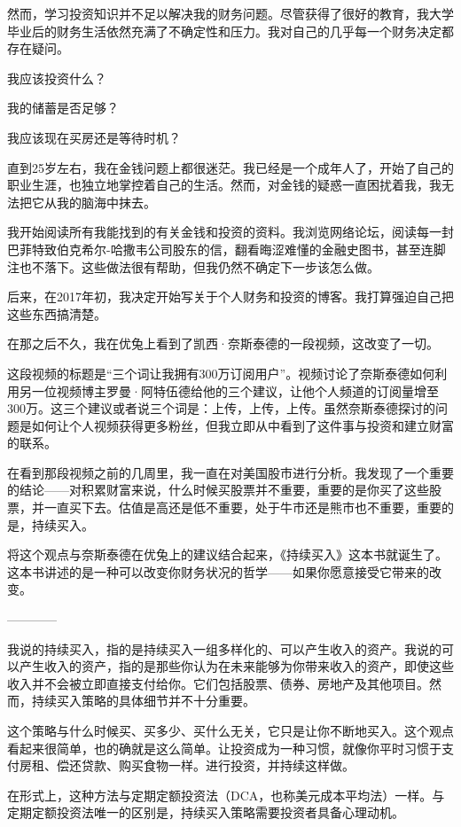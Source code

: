 然而，学习投资知识并不足以解决我的财务问题。尽管获得了很好的教育，我大学毕业后的财务生活依然充满了不确定性和压力。我对自己的几乎每一个财务决定都存在疑问。

我应该投资什么？

我的储蓄是否足够？

我应该现在买房还是等待时机？

直到25岁左右，我在金钱问题上都很迷茫。我已经是一个成年人了，开始了自己的职业生涯，也独立地掌控着自己的生活。然而，对金钱的疑惑一直困扰着我，我无法把它从我的脑海中抹去。

我开始阅读所有我能找到的有关金钱和投资的资料。我浏览网络论坛，阅读每一封巴菲特致伯克希尔-哈撒韦公司股东的信，翻看晦涩难懂的金融史图书，甚至连脚注也不落下。这些做法很有帮助，但我仍然不确定下一步该怎么做。

后来，在2017年初，我决定开始写关于个人财务和投资的博客。我打算强迫自己把这些东西搞清楚。

在那之后不久，我在优兔上看到了凯西·奈斯泰德的一段视频，这改变了一切。

这段视频的标题是“三个词让我拥有300万订阅用户”。视频讨论了奈斯泰德如何利用另一位视频博主罗曼·阿特伍德给他的三个建议，让他个人频道的订阅量增至300万。这三个建议或者说三个词是：上传，上传，上传。虽然奈斯泰德探讨的问题是如何让个人视频获得更多粉丝，但我立即从中看到了这件事与投资和建立财富的联系。

在看到那段视频之前的几周里，我一直在对美国股市进行分析。我发现了一个重要的结论——对积累财富来说，什么时候买股票并不重要，重要的是你买了这些股票，并一直买下去。估值是高还是低不重要，处于牛市还是熊市也不重要，重要的是，持续买入。

将这个观点与奈斯泰德在优兔上的建议结合起来，《持续买入》这本书就诞生了。这本书讲述的是一种可以改变你财务状况的哲学——如果你愿意接受它带来的改变。

\begin{center}
————
\end{center}

我说的持续买入，指的是持续买入一组多样化的、可以产生收入的资产。我说的可以产生收入的资产，指的是那些你认为在未来能够为你带来收入的资产，即使这些收入并不会被立即直接支付给你。它们包括股票、债券、房地产及其他项目。然而，持续买入策略的具体细节并不十分重要。

这个策略与什么时候买、买多少、买什么无关，它只是让你不断地买入。这个观点看起来很简单，也的确就是这么简单。让投资成为一种习惯，就像你平时习惯于支付房租、偿还贷款、购买食物一样。进行投资，并持续这样做。

在形式上，这种方法与定期定额投资法（DCA，也称美元成本平均法）一样。与定期定额投资法唯一的区别是，持续买入策略需要投资者具备心理动机。

